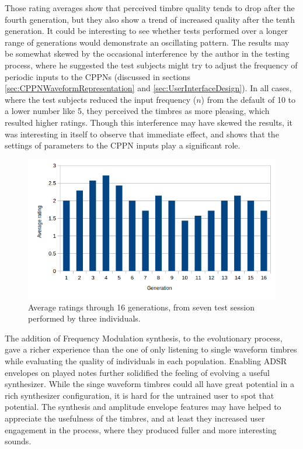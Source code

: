 \documentclass[conference]{IEEEtran}
\begin{document}
Those rating averages show that perceived timbre quality tends to drop after the fourth generation, but they also show a trend of increased quality after the tenth generation.  It could be interesting to see whether tests performed over a longer range of generations would demonstrate an oscillating pattern.  The results may be somewhat skewed by the occasional interference by the author in the testing process, where he suggested the test subjects might try to adjust the frequency of periodic inputs to the CPPNs (discussed in sections \ref{sec:CPPNWaveformRepresentation} and \ref{sec:UserInterfaceDesign}).  In all cases, where the test subjects reduced the input frequency ($n$) from the default of 10 to a lower number like 5, they perceived the timbres as more pleasing, which resulted higher ratings.  Though this interference may have skewed the results, it was interesting in itself to observe that immediate effect, and shows that the settings of parameters to the CPPN inputs play a significant role.

\begin{figure}[htp]
	\centerline{\includegraphics[width=1\columnwidth]{breedesizerTestSessionStats.png}}
	\caption{Average ratings through 16 generations, from seven test session performed by three individuals.}
	\label{fig:averageRatings}
\end{figure}

The addition of Frequency Modulation synthesis, to the evolutionary process, gave a richer experience than the one of only listening to single waveform timbres while evaluating the quality of individuals in each population.  Enabling ADSR envelopes on played notes further solidified the feeling of evolving a useful synthesizer.  While the singe waveform timbres could all have great potential in a rich synthesizer configuration, it is hard for the untrained user to spot that potential.  The synthesis and amplitude envelope features may have helped to appreciate the usefulness of the timbres, and at least they increased user engagement in the process, where they produced fuller and more interesting sounds.
\end{document}
